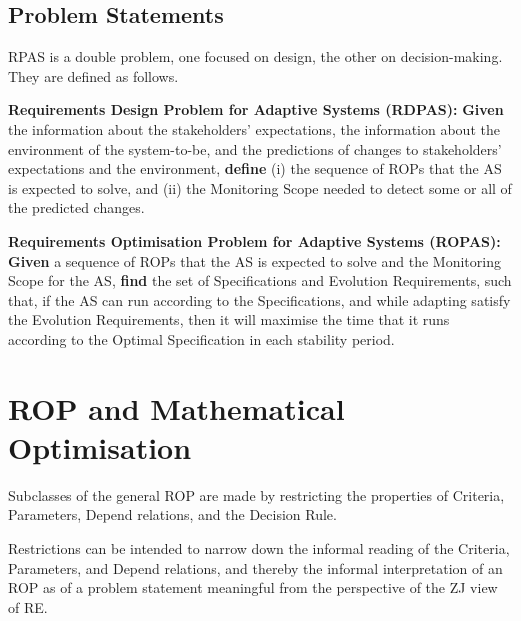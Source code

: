 \documentclass[graybox]{svmult}
\newcommand{\xb}[1]{\textbf{#1}}
\newcommand{\RE}{RE}
\newcommand{\ASfull}{Adaptive System}
\newcommand{\AS}{AS}
\newcommand{\RPAS}{RPAS}
\newcommand{\ZJ}{ZJ}
\newcommand{\Specification}{Specification}
\newcommand{\Criteria}{Criteria}
\newcommand{\ProblemInstance}{Problem Instance}
\newcommand{\Parameter}{Parameter}
\newcommand{\Depend}{Depend}
\newcommand{\OptimalSpecification}{Optimal Specification}
\newcommand{\DecisionRule}{Decision Rule}
\newcommand{\ROPfull}{Requirements Optimisation Problem}
\newcommand{\ROP}{ROP}
\newcommand{\RDPfull}{Requirements Design Problem}
\newcommand{\MonitoringScope}{Monitoring Scope}
\newcommand{\MonitoredVariable}{Monitored Variable}
\newcommand{\RDPASfull}{\RDPfull{} for \ASfull}
\newcommand{\RDPAS}{RDPAS}
\newcommand{\ROPASfull}{\ROPfull{} for \ASfull}
\newcommand{\ROPAS}{ROPAS}
\newcommand{\EvolutionRequirement}{Evolution Requirement}
\begin{document}


%
\subsection{Problem Statements}\label{s:rpas:statements}
\RPAS{} is a double problem, one focused on design, the other on decision-making. They are defined as follows.

\begin{definition}\label{d:rdpas}
\xb{\RDPASfull s (\RDPAS):} \xb{Given} the information about the stakeholders' expectations, the information about the environment of the system-to-be, and the predictions of changes to stakeholders' expectations and the environment, \xb{define} (i) the sequence of \ROP s that the \AS{} is expected to solve, and (ii) the \MonitoringScope{} needed to detect some or all of the predicted changes. 
\end{definition}

\begin{definition}\label{d:ropas}
\xb{\ROPASfull s (\ROPAS):} \xb{Given} a sequence of \ROP s that the \AS{} is expected to solve and the \MonitoringScope{} for the \AS, \xb{find} the set of \Specification s and \EvolutionRequirement s, such that, if the \AS{} can run according to the \Specification s, and while adapting satisfy the \EvolutionRequirement s, then it will maximise the time that it runs according to the \OptimalSpecification{} in each stability period.
\end{definition}


%
\section{\ROP{} and Mathematical Optimisation}\label{s:mathematical-optimisation}
Subclasses of the general \ROP{} are made by restricting the properties of \Criteria, \Parameter s, \Depend{} relations, and the \DecisionRule. 

Restrictions can be intended to narrow down the informal reading of the \Criteria, \Parameter s, and \Depend{} relations, and thereby the informal interpretation of an \ROP{} as of a problem statement meaningful from the perspective of the \ZJ{} view of \RE. 
\end{document}
